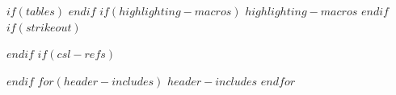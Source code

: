 \providecommand{\tightlist}{%
  \setlength{\itemsep}{0pt}\setlength{\parskip}{0pt}}
\makeatletter
{}
\newsavebox\pandoc@box
\newcommand*\pandocbounded[1]{%
  \sbox\pandoc@box{#1}%
  \Gscale@div\@tempa{\textheight}{\dimexpr\ht\pandoc@box+\dp\pandoc@box\relax}%
  \Gscale@div\@tempb{\linewidth}{\wd\pandoc@box}%
  \ifdim\@tempb\p@<\@tempa\p@\let\@tempa\@tempb\fi%
  \ifdim\@tempa\p@<\p@\scalebox{\@tempa}{\usebox\pandoc@box}%
  \else\usebox{\pandoc@box}%
  \fi%
}
$if(tables)$
$endif$
\makeatother
$if(highlighting-macros)$
$highlighting-macros$
$endif$
$if(strikeout)$
\usepackage[normalem]{ulem}
\providecommand{\st}[1]{\sout{#1}}
$endif$
$if(csl-refs)$
\NewDocumentCommand\citeproctext{}{}
\NewDocumentCommand{}
\makeatletter
 \let\@cite@ofmt\@firstofone
 \def\@biblabel#1{}
 \def\@cite#1#2{{#1\if@tempswa , #2\fi}}
\makeatother
\newlength{\cslhangindent}
\setlength{\cslhangindent}{1.5em}
\newlength{\csllabelwidth}
\setlength{\csllabelwidth}{3em}
\newenvironment{CSLReferences}[2]
 {\begin{list}{}{%
  \setlength{\itemindent}{0pt}
  \setlength{\leftmargin}{0pt}
  \setlength{\parsep}{0pt}
  \ifodd #1
   \setlength{\leftmargin}{\cslhangindent}
   \setlength{\itemindent}{-1\cslhangindent}
  \fi
  \setlength{\itemsep}{#2\baselineskip}}}
 {\end{list}}
\usepackage{calc}
\newcommand{\CSLBlock}[1]{\hfill\break\parbox[t]{\linewidth}{\strut\ignorespaces#1\strut}}
\newcommand{\CSLLeftMargin}[1]{\parbox[t]{\csllabelwidth}{\strut#1\strut}}
\newcommand{\CSLRightInline}[1]{\parbox[t]{\linewidth - \csllabelwidth}{\strut#1\strut}}
\newcommand{\CSLIndent}[1]{\hspace{\cslhangindent}#1}
$endif$
$for(header-includes)$
$header-includes$
$endfor$
